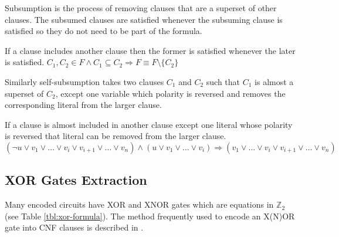 Subsumption is the process of removing clauses that are a superset
of other clauses. The subsumed clauses are satisfied whenever
the subsuming clause is satisfied so they do not need to be part of
the formula.

\begin{myprop}[Subsumption]
  If a clause includes another clause then the former is satisfied whenever the
  later is satisfied.
  $C_1, C_2 \in F \land C_1 \subseteq C_2 \Rightarrow F \equiv F \setminus \{
  C_2 \}$
\end{myprop}

Similarly self-subsumption takes two clauses $C_1$ and $C_2$ such
that $C_1$ is almost a superset of $C_2$, except one variable which
polarity is reversed and removes the corresponding literal from
the larger clause.

\begin{myprop}
  If a clause is almost included in another clause except one literal whose
  polarity is reversed that literal can be removed from the larger clause.
  $(\neg u \lor v_1 \lor \ldots \lor v_i \lor v_{i+1} \lor \ldots \lor v_n)
    \land (u \lor v_1 \lor \ldots \lor v_i)
    \Rightarrow (v_1 \lor \ldots \lor v_i \lor v_{i+1} \lor \ldots \lor v_n)$
\end{myprop}


\subsection{XOR Gates Extraction}
\label{ssec:xor-extraction}

Many encoded circuits have XOR and XNOR gates which are equations
in $\mathbb{Z}_2$ (see Table \ref{tbl:xor-formula}). The method
frequently used to encode an X(N)OR gate into CNF clauses is described
in \cite{Roy_restoringcircuit}.

\begin{table}
  \centering

  \caption{XOR/XNOR gates}
  \label{tbl:xor-formula}
\end{table}

